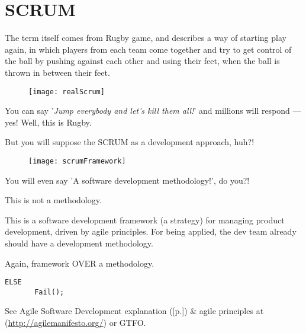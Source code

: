 \section{SCRUM}
\label{sec:SCRUM}

The term itself comes from Rugby game, and describes a way of starting play again, in which players from each team come together and try to get control of the ball by pushing against each other and using their feet, when the ball is thrown in between their feet. 

\begin{figure}[!h]
\centering
\texttt{[image: realScrum]}
\caption{}
\label{fig:realScrum}
\end{figure}

You can say '\textit{Jump everybody and let's kill them all!}' and millions will respond — yes! Well, this is Rugby.

But you will suppose the SCRUM as a development approach, huh?!

\begin{figure}[!h]
\centering
\texttt{[image: scrumFramework]}
\caption{}
\label{fig:scrumFramework}
\end{figure}

You will even say 'A software development methodology!', do you?!

This is not a methodology. 

This is a software development framework (a strategy) for managing product development, driven by agile principles. For being applied, the dev team already should have a development methodology.

Again, framework OVER a methodology.

\begin{verbatim}
ELSE
       Fail();
\end{verbatim}

See  Agile Software Development explanation ([p.\pageref{sec:Agile Software Development}]) \& agile principles at (\url{http://agilemanifesto.org/}) or GTFO.